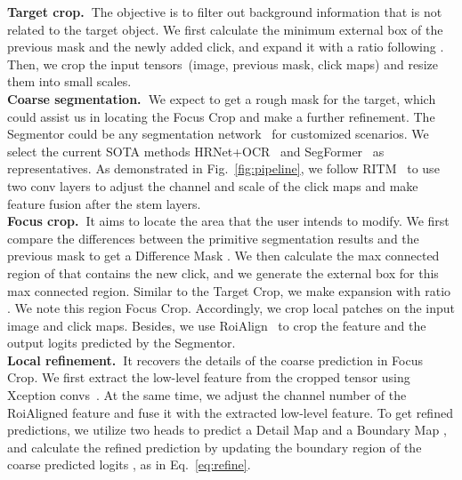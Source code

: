 \documentclass[10pt,twocolumn,letterpaper]{article}
\begin{document}
\noindent \textbf{Target crop.~}The objective is to filter out background information that is not related to the target object. We first calculate the minimum external box of the previous mask and the newly added click, and expand it with a ratio  following \cite{fbrs,sofiiuk2021ritm}. Then, we crop the input tensors~(image, previous mask, click maps) and resize them into small scales. \\ 

\noindent \textbf{Coarse segmentation.~}We expect to get a rough mask for the target, which could assist us in locating the Focus Crop and make a further refinement. The Segmentor could be any segmentation network~\cite{pspnet,chen2017deeplab,long2015fcn,xiao2018upernet,peng2017largekernel} for customized scenarios. We select the current SOTA methods HRNet+OCR~\cite{wang2020hrnet,yuan2020ocr} and SegFormer~\cite{xie2021segformer} as representatives. As demonstrated in Fig.~\ref{fig:pipeline}, we follow RITM~\cite{sofiiuk2021ritm} to use two conv layers to adjust the channel and scale of the click maps and make feature fusion after the stem layers. \\

\noindent \textbf{Focus crop.~}It aims to locate the area that the user intends to modify. We first compare the differences between the primitive segmentation results and the previous mask to get a Difference Mask . We then calculate the max connected region of  that contains the new click, and we generate the external box for this max connected region.
Similar to the Target Crop, we make expansion with ratio . We note this region Focus Crop. Accordingly, we crop local patches on the input image and click maps. Besides, we use RoiAlign~\cite{he2017mask} to crop the feature and the output logits predicted by the Segmentor. \\



\noindent \textbf{Local refinement.~}It recovers the details of the coarse prediction in Focus Crop. 
We first extract the low-level feature from the cropped tensor using Xception convs~\cite{chollet2017xception}. At the same time, we adjust the channel number of the RoiAligned feature and fuse it with the extracted low-level feature. To get refined predictions, we utilize two heads to predict a Detail Map  and a Boundary Map , and calculate the refined prediction  by updating the boundary region of the coarse predicted logits , as in Eq.~\ref{eq:refine}.
\end{document}
